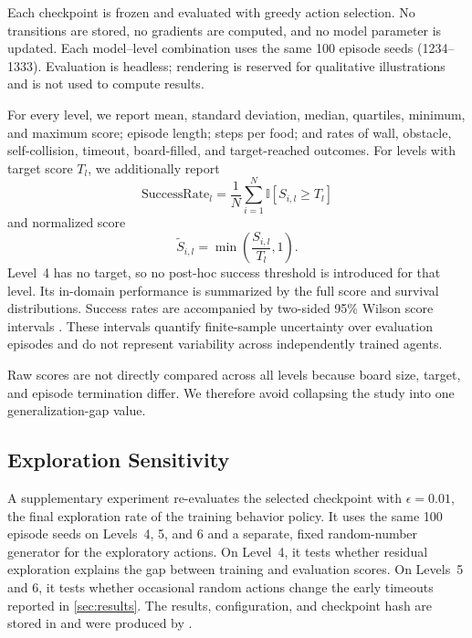 \documentclass[journal]{IEEEtran}
\begin{document}
Each checkpoint is frozen and evaluated with greedy action selection. No
transitions are stored, no gradients are computed, and no model parameter is
updated. Each model--level combination uses the same 100 episode seeds
(1234--1333). Evaluation is headless; rendering is reserved for qualitative
illustrations and is not used to compute results.

For every level, we report mean, standard deviation, median, quartiles, minimum,
and maximum score; episode length; steps per food; and rates of wall, obstacle,
self-collision, timeout, board-filled, and target-reached outcomes. For levels
with target score $T_l$, we additionally report
\begin{equation}
  \mathrm{SuccessRate}_l=\frac{1}{N}\sum_{i=1}^{N}
  \mathbb{I}\left[S_{i,l}\ge T_l\right]
  \label{eq:success}
\end{equation}
and normalized score
\begin{equation}
  \widetilde{S}_{i,l}=\min\left(\frac{S_{i,l}}{T_l},1\right).
  \label{eq:normalized-score}
\end{equation}
Level~4 has no target, so no post-hoc success threshold is introduced for that
level. Its in-domain performance is summarized by the full score and survival
distributions. Success rates are accompanied by two-sided 95\% Wilson score
intervals \cite{wilson1927probable}. These intervals quantify finite-sample uncertainty over evaluation
episodes and do not represent variability across independently trained agents.

Raw scores are not directly compared across all levels because board size,
target, and episode termination differ. We therefore avoid collapsing the study
into one generalization-gap value.

\subsection{Exploration Sensitivity}

A supplementary experiment re-evaluates the selected checkpoint with
$\epsilon=0.01$, the final exploration rate of the training behavior policy.
It uses the same 100 episode seeds on Levels~4, 5, and 6 and a separate,
fixed random-number generator for the exploratory actions. On Level~4, it tests
whether residual exploration explains the gap between training and evaluation
scores. On Levels~5 and 6, it tests whether occasional random actions change
the early timeouts reported in \cref{sec:results}. The results, configuration,
and checkpoint hash are stored in  and were
produced by .
\end{document}
